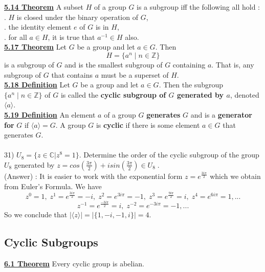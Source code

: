 \documentclass[12pt, letterpaper]{article}
\begin{document}
\noindent \underline{\bf 5.14 Theorem} A subset $H$ of a group $G$ is a subgroup iff the following all hold : \\

. $H$ is closed under the binary operation of $G$, \\
. the identity element $e$ of $G$ is in $H$, \\
. for all $a \in H$, it is true that $a^{-1} \in H$ also.\\

\noindent \underline{\bf 5.17 Theorem} Let $G$ be a group and let $a \in G$. Then $$H = \{a^n \;|\; n \in \mathbb{Z}\}$$ is a subgroup of $G$ and is the smallest subgroup of $G$ containing $a$. That is, any subgroup of $G$ that contains $a$ must be a superset of $H$.\\

\noindent \underline{\bf 5.18 Definition} Let $G$ be a group and let $a \in G$. Then the subgroup $\{a^n \;| \; n \in \mathbb{Z} \}$ of $G$ is called the {\bf cyclic subgroup of $G$ generated by $a$}, denoted $\langle a \rangle$.\\

\noindent \underline{\bf 5.19 Definition} An element $a$ of a group $G$ {\bf generates} $G$ and is a {\bf generator for} $G$ if $\langle a \rangle = G$. A group $G$ is {\bf cyclic} if there is some element $a \in G$ that generates $G$. \\

 \\

31) $U_8 = \{z \in \mathbb{C} | z^8 = 1 \}$. Determine the order of the cyclic subgroup of the group $U_8$ generated by $z = cos(\frac{3 \pi}{2}) + isin(\frac{3 \pi}{2}) \in U_8\;$.\\

(Answer) : It is easier to work with the exponential form $z = e^{\frac{3i\pi}{2}}$ which we obtain from Euler's Formula. We have $$z^0 = 1, \; z^1 = e^{\frac{3i\pi}{2}} = -i,\; z^2 = e^{3i\pi} = -1,\; z^3 = e^{\frac{9i\pi}{2}} = i,\; z^4 = e^{6i\pi} = 1,...$$
$$z^{-1} = e^{\frac{-3i\pi}{2}} = i, \; z^{-2} = e^{-3i\pi} = -1,...$$
\indent So we conclude that $|\langle z \rangle| = |\{1,-i,-1,i\}| = 4$.

\subsection{Cyclic Subgroups}

\noindent \underline{\bf 6.1 Theorem} Every cyclic group is abelian.\\
\end{document}
